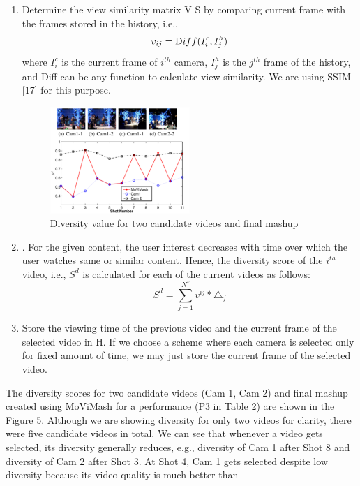 \documentclass{new}
\begin{document}
\begin{enumerate}
    \item Determine the view similarity matrix V S by comparing current
frame with the frames stored in the history, i.e.,
\begin{equation}
     v_{ij} = \text Diff(I_i^c,I_j^h)
\end{equation}
where $I_i^c$ is the current frame of $i^{th}$ camera, $I_j^h$ is the $j^{th}$ frame of the history, and Diff can be any function to calculate view similarity. We are using SSIM [17] for this purpose.
\begin{figure}[h]
\includegraphics[width=0.5\textwidth]{img5}
\caption{ Diversity value for two candidate videos and final
mashup}
\end{figure}
    \item . For the given content, the user interest decreases with time over which the user watches same or similar content. Hence,
the diversity score of the $i^{th}$ video, i.e., $S^d$ is calculated for each of the current videos as follows:
\begin{equation}
    S^d = \sum_{j=1}^{N^v} v^{ij} * \triangle_j
\end{equation}
    \item Store the viewing time of the previous video and the current
frame of the selected video in H. If we choose a scheme
where each camera is selected only for fixed amount of time,
we may just store the current frame of the selected video.
\end{enumerate}
The diversity scores for two candidate videos (Cam 1, Cam 2)
and final mashup created using MoViMash for a performance (P3
in Table 2) are shown in the Figure 5. Although we are showing
diversity for only two videos for clarity, there were five candidate
videos in total. We can see that whenever a video gets selected,
its diversity generally reduces, e.g., diversity of Cam 1 after Shot 8
and diversity of Cam 2 after Shot 3. At Shot 4, Cam 1 gets selected
despite low diversity because its video quality is much better than
\end{document}
